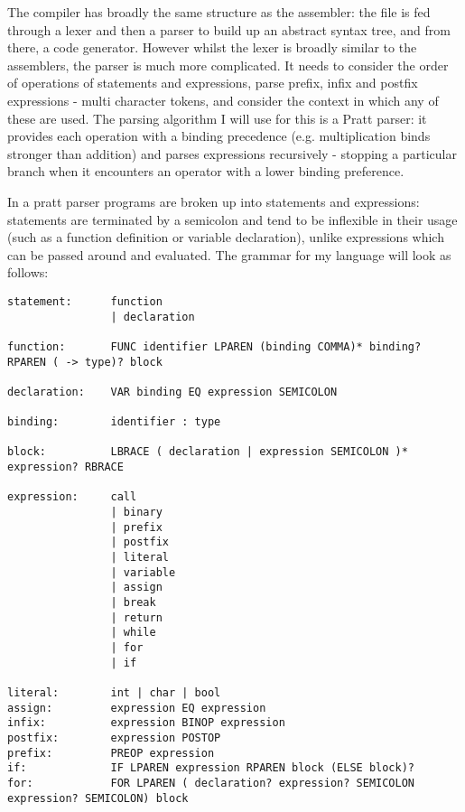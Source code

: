 The compiler has broadly the same structure as the assembler: the file is fed through a lexer and then a parser to build up an abstract syntax tree, and from there, a code generator. However whilst the lexer is broadly similar to the assemblers, the parser is much more complicated. It needs to consider the order of operations of statements and expressions, parse prefix, infix and postfix expressions - multi character tokens, and consider the context in which any of these are used. The parsing algorithm I will use for this is a Pratt parser: it provides each operation with a binding precedence (e.g. multiplication binds stronger than addition) and parses expressions recursively - stopping a particular branch when it encounters an operator with a lower binding preference.

In a pratt parser programs are broken up into statements and expressions: statements are terminated by a semicolon and tend to be inflexible in their usage (such as a function definition or variable declaration), unlike expressions which can be passed around and evaluated. The grammar for my language will look as follows:

\begin{lstlisting}
statement:      function 
                | declaration

function:       FUNC identifier LPAREN (binding COMMA)* binding? RPAREN ( -> type)? block

declaration:    VAR binding EQ expression SEMICOLON

binding:        identifier : type

block:          LBRACE ( declaration | expression SEMICOLON )* expression? RBRACE

expression:     call 
                | binary 
                | prefix 
                | postfix 
                | literal 
                | variable 
                | assign 
                | break 
                | return
                | while 
                | for 
                | if

literal:        int | char | bool
assign:         expression EQ expression 
infix:          expression BINOP expression 
postfix:        expression POSTOP
prefix:         PREOP expression
if:             IF LPAREN expression RPAREN block (ELSE block)? 
for:            FOR LPAREN ( declaration? expression? SEMICOLON expression? SEMICOLON) block
\end{lstlisting}

